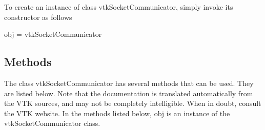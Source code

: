 To create an instance of class vtk\-Socket\-Communicator, simply invoke its constructor as follows \begin{DoxyVerb}  obj = vtkSocketCommunicator
\end{DoxyVerb}
 \hypertarget{vtkwidgets_vtkxyplotwidget_Methods}{}\subsection{Methods}\label{vtkwidgets_vtkxyplotwidget_Methods}
The class vtk\-Socket\-Communicator has several methods that can be used. They are listed below. Note that the documentation is translated automatically from the V\-T\-K sources, and may not be completely intelligible. When in doubt, consult the V\-T\-K website. In the methods listed below, {\ttfamily obj} is an instance of the vtk\-Socket\-Communicator class. 
